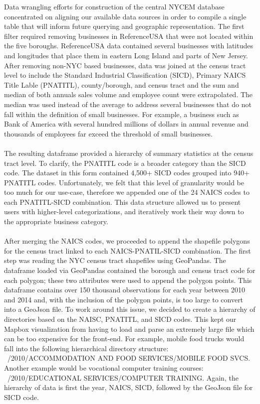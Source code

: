 \documentclass[article, 11pt]{article} %
\begin{document}
Data wrangling efforts for construction of the central NYCEM database concentrated on aligning our available data sources in order to compile a single table that will inform future querying and geographic representation. The first filter required removing businesses in ReferenceUSA that were not located within the five boroughs. ReferenceUSA data contained several businesses with latitudes and longitudes that place them in eastern Long Island and parts of New Jersey. After removing non-NYC based businesses, data was joined at the census tract level to include the Standard Industrial Classification (SICD), Primary NAICS Title Lable (PNATITL), county/borough, and census tract and the sum and median of both annuals sales volume and employee count were extrapolated. The median was used instead of the average to address several businesses that do not fall within the definition of small businesses. For example, a business such as Bank of America with several hundred millions of dollars in annual revenue and thousands of employees far exceed the threshold of small businesses.
\\\\
The resulting dataframe provided a hierarchy of summary statistics at the census tract level. To clarify, the PNATITL code is a broader category than the SICD code. The dataset in this form contained 4,500+ SICD codes grouped into 940+ PNATITL codes. Unfortunately, we felt that this level of granularity would be too much for our use-case, therefore we appended one of the 24 NAICS codes to each PNATITL-SICD combination. This data structure allowed us to present users with higher-level categorizations, and iteratively work their way down to the appropriate business category.
\\\\
After merging the NAICS codes, we proceeded to append the shapefile polygons for the census tract linked to each NAICS-PNATIL-SICD combination. The first step was reading the NYC census tract shapefiles using GeoPandas. The dataframe loaded via GeoPandas contained the borough and census tract code for each polygon; these two attributes were used to append the polygon points. This dataframe contains over 150 thousand observations for each year between 2010 and 2014 and, with the inclusion of the polygon points, is too large to convert into a GeoJson file. To work around this issue, we decided to create a hierarchy of directories based on the NAISC, PNATITL, and SICD codes. This kept our Mapbox visualization from having to load and parse an extremely large file which can be too expensive for the front-end. For example, mobile food trucks would fall into the following hierarchical directory structure: ~/2010/ACCOMMODATION AND FOOD SERVICES/MOBILE FOOD SVCS. Another example would be vocational computer training courses: ~/2010/EDUCATIONAL SERVICES/COMPUTER TRAINING. Again, the hierarchy of data is first the year, NAICS, SICD, followed by the GeoJson file for SICD code.
\end{document}
